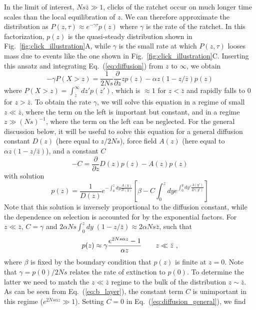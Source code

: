 \documentclass[rmp,preprint]{revtex4}
\newcommand{\EQ}[1]{Eq.~(\ref{eq:#1})}
\newcommand{\FIG}[1]{Fig.~\ref{fig:#1}}
\newcommand{\xz}{z}
\newcommand{\xzs}{\bar{\xz}}
\newcommand{\rate}{\gamma}
\begin{document}
In the limit of interest, $Ns\xzs\gg 1$, clicks of the ratchet occur on much longer time scales than the local equilibration of $\xz$. We can therefore approximate the distribution as $P(\xz,\tau)\approx e^{-\rate \tau} p(\xz)$ where $\rate$ is the rate of the ratchet. In this factorization, $p(\xz)$ is the quasi-steady distribution shown in \FIG{click_illustration}A, while $\rate$ is the small rate at which $P(z,\tau)$ looses mass due to events like the one shown in \FIG{click_illustration}C. Inserting this ansatz and integrating \EQ{diffusion} from $\xz$ to $\infty$, we obtain
\begin{equation}
\label{eq:steady_state_diffusion}
-\rate P(X>\xz) = \frac{1}{2Ns} \frac{\partial}{\partial\xz} \xz p(\xz) - \alpha \xz(1-\xz/\xzs) p(\xz)
\end{equation}
 where $P(X>\xz) = \int_\xz^\infty d\xz' p(\xz')$, which is $\approx 1$ for $\xz < \xzs$ and rapidly falls to $0$ for $\xz>\xzs$. To obtain the rate $\rate$, we will solve this equation in a regime of small $\xz \ll \xzs$, where the term on the left is important but constant, and in a regime $\xz \gg (Ns)^{-1}$, where the term on the left can be neglected. For the general discussion below, it will be useful to solve this equation for a general diffusion constant $D(\xz)$ (here equal to $\xz/2Ns$), force field $A(\xz)$ (here equal to $\alpha \xz(1-\xz/\xzs)$), and a constant $C$
\begin{equation}
\label{eq:general}
-C = \frac{\partial}{\partial\xz} D(\xz) p(\xz) - A(\xz) p(\xz)
\end{equation}
with solution 
\begin{equation}
\label{eq:diffusion_general}
p(\xz) = \frac{1}{D(\xz)} e^{-\int_0^\xz dy \frac{A(y)}{D(y)} }\left[\beta - C\int_0^\xz dy e^{\int_0^y dy' \frac{A(y')}{D(y')} }\right]
\end{equation}
Note that this solution is inversely proportional to the diffusion constant, while the dependence on selection is accounted for by the exponential factors.
For $\xz\ll\xzs$, $C=\rate$ and $2\alpha Ns\int_0^\xz dy \;(1-\xz/\xzs) \approx 2\alpha Ns \xzs$, such that
\begin{equation}
\label{eq:b_layer}
p(\xz) \approx {\rate} {e^{2Ns \alpha \xz} -1 \over \alpha \xz} \quad\quad \xz\ll \xzs \ ,
\end{equation}
where $\beta$ is fixed by the boundary condition that $p(\xz)$ is finite at $\xz=0$.
Note that $\rate=p(0)/2Ns$ relates the rate of extinction to $p(0)$. To determine the latter we need to match the $\xz\ll\xzs$ regime to the bulk of the distribution $\xz \sim \xzs$. As can be seen from \EQ{b_layer}, the constant term $C$ is unimportant in this regime ($e^{2Ns\alpha \xz}\gg 1$). Setting $C=0$ in \EQ{diffusion_general}, we find
\end{document}
